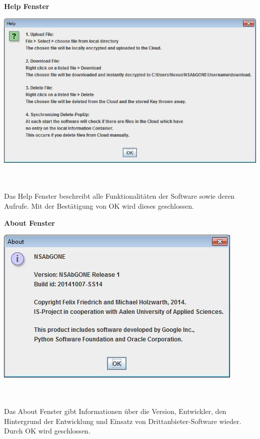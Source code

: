 \documentclass[12pt,a4paper,bibliography=totocnumbered,listof=totocnumbered]{scrartcl}
\begin{document}
\textbf{Help Fenster}
\vspace{1em}
$\;$\\
\begin{minipage}{\linewidth}
	\centering
	\includegraphics[width=0.4\linewidth]{./img/HelpPopUp.jpg}
	\label{HelpPopUp}
\end{minipage}
\\\\Das Help Fenster beschreibt alle Funktionalitäten der Software sowie deren Aufrufe. Mit der Bestätigung von OK wird dieses  geschlossen.
\pagebreak

\textbf{About Fenster}
\vspace{1em}
$\;$\\
\begin{minipage}{\linewidth}
	\centering
	\includegraphics[width=0.4\linewidth]{./img/AboutPopUp.jpg}
	\label{AboutPopUp}
\end{minipage}
\\\\Das About Fenster gibt Informationen über die Version, Entwickler, den Hintergrund der Entwicklung und Einsatz von Drittanbieter-Software wieder. Durch OK wird geschlossen.
\end{document}
